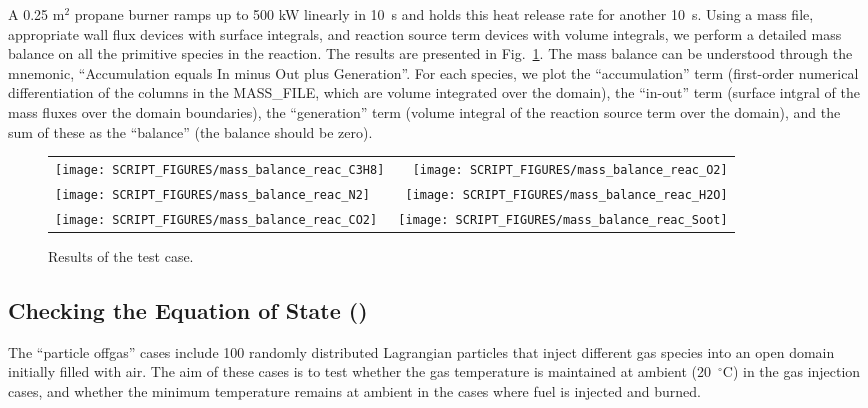 \documentclass[11pt]{book}
\begin{document}
A 0.25 m$^2$ propane burner ramps up to 500 kW linearly in 10~s and holds this heat release rate for another 10~s.  Using a mass file, appropriate wall flux devices with surface integrals, and reaction source term devices with volume integrals, we perform a detailed mass balance on all the primitive species in the reaction.  The results are presented in Fig.~\ref{fig:mass_balance_reac}.  The mass balance can be understood through the mnemonic, ``Accumulation equals In minus Out plus Generation''.  For each species, we plot the ``accumulation'' term (first-order numerical differentiation of the columns in the {\ct MASS\_FILE}, which are volume integrated over the domain), the ``in-out'' term (surface intgral of the mass fluxes over the domain boundaries), the ``generation'' term (volume integral of the reaction source term over the domain), and the sum of these as the ``balance'' (the balance should be zero).

\begin{figure}[ht]
\begin{tabular*}{\textwidth}{lr}
\texttt{[image: SCRIPT\_FIGURES/mass\_balance\_reac\_C3H8]} &
\texttt{[image: SCRIPT\_FIGURES/mass\_balance\_reac\_O2]}   \\
\texttt{[image: SCRIPT\_FIGURES/mass\_balance\_reac\_N2]}   &
\texttt{[image: SCRIPT\_FIGURES/mass\_balance\_reac\_H2O]}  \\
\texttt{[image: SCRIPT\_FIGURES/mass\_balance\_reac\_CO2]}  &
\texttt{[image: SCRIPT\_FIGURES/mass\_balance\_reac\_Soot]}
\end{tabular*}
\caption[The  test case]{Results of the  test case.}
\label{fig:mass_balance_reac}
\end{figure}

\subsection{Checking the Equation of State (\texorpdfstring{}{particle\_offgas})}
\label{particle_offgas_1}
\label{particle_offgas_2}
\label{particle_offgas_3}
\label{particle_offgas_4}

The ``particle offgas'' cases include 100 randomly distributed Lagrangian particles that inject different gas species into an open domain initially filled with air. The aim of these cases is to test whether the gas temperature is maintained at ambient (20~$^\circ$C) in the gas injection cases, and whether the minimum temperature remains at ambient in the cases where fuel is injected and burned.
\end{document}
